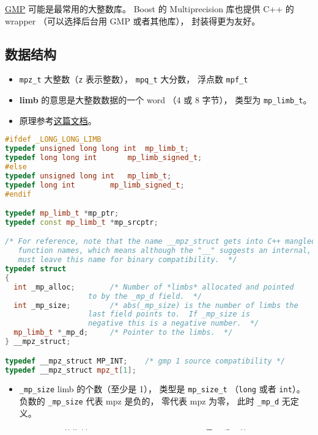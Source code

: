 
\begin{issues}
\issueDraft
\end{issues}

\href{https://gmplib.org/}{GMP} 可能是最常用的大整数库。 Boost 的 Multiprecision 库也提供 C++ 的 wrapper （可以选择后台用 GMP 或者其他库）， 封装得更为友好。

\subsection{数据结构}
\begin{itemize}
\item \verb|mpz_t| 大整数（\verb|z| 表示整数）， \verb|mpq_t| 大分数， 浮点数 \verb|mpf_t|
\item \textbf{limb} 的意思是大整数数据的一个 word （4 或 8 字节）， 类型为 \verb|mp_limb_t|。
\item 原理参考\href{https://gmplib.org/manual/Integer-Internals#Integer-Internals}{这篇文档}。
\end{itemize}

\begin{lstlisting}[language=cpp]
#ifdef _LONG_LONG_LIMB
typedef unsigned long long int	mp_limb_t;
typedef long long int		mp_limb_signed_t;
#else
typedef unsigned long int	mp_limb_t;
typedef long int		mp_limb_signed_t;
#endif

typedef mp_limb_t *mp_ptr;
typedef const mp_limb_t *mp_srcptr;

/* For reference, note that the name __mpz_struct gets into C++ mangled
   function names, which means although the "__" suggests an internal, we
   must leave this name for binary compatibility.  */
typedef struct
{
  int _mp_alloc;		/* Number of *limbs* allocated and pointed
				   to by the _mp_d field.  */
  int _mp_size;			/* abs(_mp_size) is the number of limbs the
				   last field points to.  If _mp_size is
				   negative this is a negative number.  */
  mp_limb_t *_mp_d;		/* Pointer to the limbs.  */
} __mpz_struct;

typedef __mpz_struct MP_INT;    /* gmp 1 source compatibility */
typedef __mpz_struct mpz_t[1];
\end{lstlisting}

\begin{itemize}
\item \verb|_mp_size| limb 的个数（至少是 1）， 类型是 \verb|mp_size_t| （\verb|long| 或者 \verb|int|）。 负数的 \verb|_mp_size| 代表 mpz 是负的， 零代表 mpz 为零， 此时 \verb|_mp_d| 无定义。
\item \verb|_mp_d| limb 的指针（little endian）， \verb|_mp_d[0]| 是最不重要的 limb， \verb|_mp_d[ABS(_mp_size)-1]| 最重要的 limb。
\verb|_mp_alloc| 和 \verb|vector.capacity()| 类似。 有 \verb|_mp_alloc >= ABS(_mp_size)|， 如果需要更多会重新 allocate。
\end{itemize}

